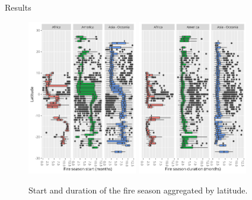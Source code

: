 \documentclass[20pt]{beamer}
\begin{document}
\begin{frame}[fragile,t]
\begin{columns}[t]
\begin{column}{0.33\linewidth}
\begin{block}{Results\vphantom{g}}
\begin{figure}[ht]
\centering
\includegraphics[width=0.45\textwidth]{figures/plot_latitude_pos_from.png}
\includegraphics[width=0.45\textwidth]{figures/plot_latitude_val_len.png}
\caption{Start and duration of the fire season aggregated by latitude.}
\label{fig:plot_latitude}
\end{figure}


    \end{block}

\end{column}




\begin{column}{0.33\linewidth}

    \vspace{1cm}


\end{column}
\end{columns}
\end{frame}
\end{document}
